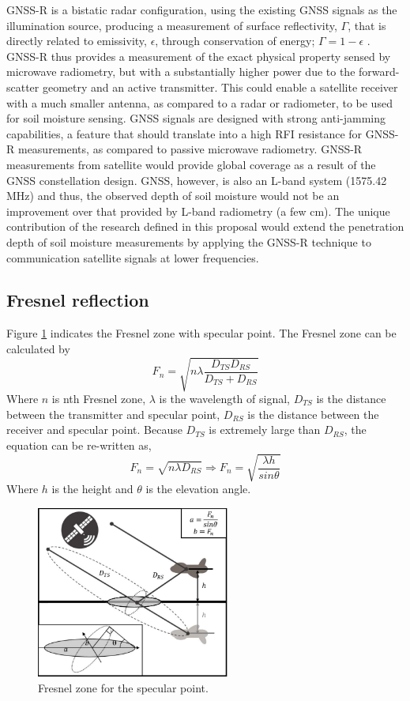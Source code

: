 \documentclass[draftcls,onecolumn]{IEEEtran}  %
\begin{document}
GNSS-R is a bistatic radar configuration, using the existing GNSS signals as the illumination source, producing a measurement of surface reflectivity, $\Gamma$, that is directly related to emissivity, $\epsilon$, through conservation of energy; $ \Gamma = 1 - \epsilon $ \cite{Jin:2011}. GNSS-R thus provides a measurement of the exact physical property sensed by microwave radiometry, but with a substantially higher power due to the forward-scatter geometry and an active transmitter. This could enable a satellite receiver with a much smaller antenna, as compared to a radar or radiometer, to be used for soil moisture sensing. GNSS signals are designed with strong anti-jamming capabilities, a feature that should translate into a high RFI resistance for GNSS-R measurements, as compared to passive microwave radiometry. GNSS-R measurements from satellite would provide global coverage as a result of the GNSS constellation design. GNSS, however, is also an L-band system (1575.42 MHz) and thus, the observed depth of soil moisture would not be an improvement over that provided by L-band
radiometry (a few cm). The unique contribution of the research defined in this proposal would extend the penetration depth of soil moisture measurements by applying the GNSS-R technique to communication satellite signals at lower frequencies.

\subsection{Fresnel reflection}
Figure \ref{fig:Fresnel zone} indicates the Fresnel zone with specular point. The Fresnel zone can be calculated by
\begin{equation}
	F_n=\sqrt{n \lambda \frac{D_{TS}D_{RS}}{D_{TS}+D_{RS}}} \label{Eq: Fresnel_zone}
\end{equation}
Where $n$ is nth Fresnel zone, $\lambda$ is the wavelength of signal, $D_{TS}$ is the distance between the transmitter and specular point, $D_{RS}$ is the distance between the receiver and specular point. Because $D_{TS}$ is extremely large than $D_{RS}$, the equation can be re-written as,
\begin{equation}
	F_n=\sqrt{n \lambda D_{RS}} \Rightarrow F_n=\sqrt{\frac{\lambda h}{sin\theta} } \label{Eq: Fresnel_zone_reduce}
\end{equation}
Where $h$ is the height and $\theta$ is the elevation angle.
\begin{figure}[!t]
	\centering
	\includegraphics[width=2.5in]{pdf/Fresnel_zone.pdf}
	\caption{Fresnel zone for the specular point.}
    \centering
	\label{fig:Fresnel zone}
\end{figure}
\end{document}
